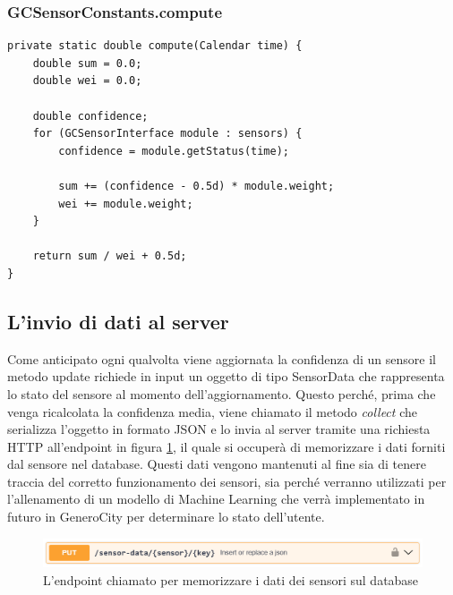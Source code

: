 \subsubsection{GCSensorConstants.compute}
\begin{verbatim}
private static double compute(Calendar time) {
    double sum = 0.0;
    double wei = 0.0;

    double confidence;
    for (GCSensorInterface module : sensors) {
        confidence = module.getStatus(time);

        sum += (confidence - 0.5d) * module.weight;
        wei += module.weight;
    }

    return sum / wei + 0.5d;
}
\end{verbatim}

\subsection{L'invio di dati al server}
Come anticipato ogni qualvolta viene aggiornata la confidenza di un sensore il metodo update richiede in input un oggetto di tipo SensorData che rappresenta lo stato del sensore al momento dell'aggiornamento. Questo perché, prima che venga ricalcolata la confidenza media, viene chiamato il metodo \textit{collect} che serializza l'oggetto in formato JSON e lo invia al server tramite una richiesta HTTP all'endpoint in figura \ref{fig:endpoint}, il quale si occuperà di memorizzare i dati forniti dal sensore nel database. Questi dati vengono mantenuti al fine sia di tenere traccia del corretto funzionamento dei sensori, sia perché verranno utilizzati per l'allenamento di un modello di Machine Learning che verrà implementato in futuro in GeneroCity per determinare lo stato dell'utente.

\begin{figure}[h]
    \centering
    \includegraphics[width=1\linewidth]{images/endpoint.png}
    \caption{L'endpoint chiamato per memorizzare i dati dei sensori sul database}
    \label{fig:endpoint}
\end{figure}

